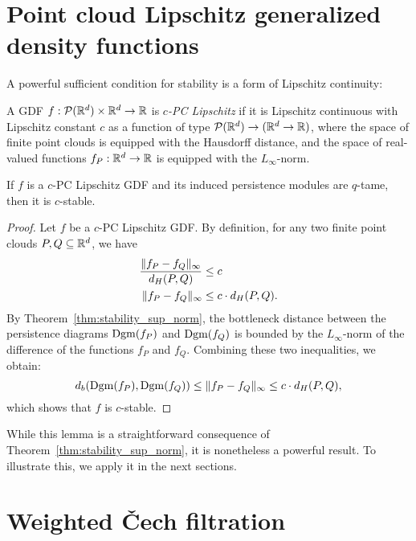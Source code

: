 \section{Point cloud Lipschitz generalized density functions}

A powerful sufficient condition for stability is a form of Lipschitz continuity:
\begin{definition}
    A GDF $f : \mathcal{P}(\mathbb{R}^d) \times \mathbb{R}^d \to \mathbb{R}$ is
    \emph{$c$-PC Lipschitz} if it is Lipschitz continuous with Lipschitz
    constant $c$ as a function of type $\mathcal{P}(\mathbb{R}^d) \to (\mathbb{R}^d \to \mathbb{R})$,
    where the space of finite point clouds is equipped with the Hausdorff
    distance, and the space of real-valued functions $f_P : \mathbb{R}^d \to \mathbb{R}$ is
    equipped with the $L_\infty$-norm.
\end{definition}
\begin{lemma}
    \label{lem:pc_lipschitz_stable}
    If $f$ is a $c$-PC Lipschitz GDF and its induced persistence modules are
    $q$-tame, then it is $c$-stable.
\end{lemma}
\begin{proof}
    Let $f$ be a $c$-PC Lipschitz GDF. By definition, for any two finite point
    clouds $P, Q \subseteq \mathbb{R}^d$, we have
    \begin{align}
        \frac{\lVert f_P - f_Q\rVert_\infty}{d_H(P, Q)} & \leq c \\
        \lVert f_P - f_Q\rVert_\infty & \leq c \cdot d_H(P, Q).
    \end{align}
    By Theorem~\ref{thm:stability_sup_norm}, the bottleneck distance between the
    persistence diagrams $\operatorname{Dgm}(f_P)$ and $\operatorname{Dgm}(f_Q)$ is bounded by the
    $L_\infty$-norm of the difference of the functions $f_P$ and $f_Q$.
    Combining these two inequalities, we obtain:
    \begin{equation}
        d_b(\operatorname{Dgm}(f_P), \operatorname{Dgm}(f_Q)) \leq \lVert f_P - f_Q\rVert_\infty \leq c \cdot d_H(P, Q),
    \end{equation}
    which shows that $f$ is $c$-stable.
\end{proof}
While this lemma is a straightforward consequence of
Theorem~\ref{thm:stability_sup_norm}, it is nonetheless a powerful result.
To illustrate this, we apply it in the next sections.

\section{Weighted \v{C}ech filtration}

